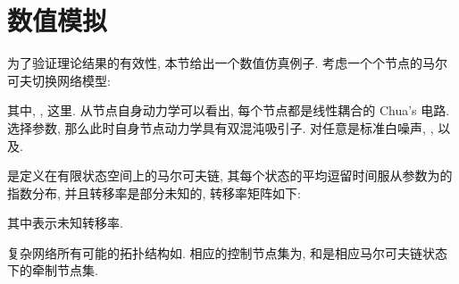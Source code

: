 \section{数值模拟}\label{simulate}
    为了验证理论结果的有效性, 本节给出一个数值仿真例子. 考虑一个个节点的马尔可夫切换网络模型:
\begin{comment}
        \begin{split}\label{exmsystem}
            \dot{x}_{i}(t)=f(x_{i}(t))-\rho(t)\sum^5_{j=1}l_{ij}(r_t)\Gamma[x_{j}(t)-x_{i}(t)+(\varepsilon_{ij}(t)\otimes\mathbf{1}_n)\xi_{ij}(t)],\quad i=1,2,\cdots,5,
        \end{split}
        \end{comment}
    其中, ,
    这里. 从节点自身动力学可以看出, 每个节点都是线性耦合的 Chua's 电路. 选择参数, 那么此时自身节点动力学具有双混沌吸引子. 对任意是标准白噪声, , 以及.
    \begin{comment}
     \begin{center}
            \subcomment[]{\texttt{[image: delay/tuopu1.eps]}}
            \subcomment[]{\texttt{[image: delay/tuopu2.eps]}}
            \subcomment[]{\texttt{[image: delay/tuopu3.eps]}}
     \end{center}
  \caption{网络系统在不同马氏链状态下可能的拓扑结构图.}\label{tuopu}
  \end{comment}
\begin{comment}[!htb]
\begin{minipage}[t]{0.48\linewidth}\centering
\texttt{[image: noise/cestate.eps]}\caption{在集中式激发策略  下, 节点各个状态随时间演变图.}\label{cefig}
\end{minipage}~~
\begin{minipage}[t]{0.48\linewidth}\centering
\texttt{[image: noise/ceEt.eps]}\caption{在集中式激发策略  下, 系统总误差随时间演变图.}\label{ceEt}
\end{minipage}
\end{comment}
   是定义在有限状态空间上的马尔可夫链, 其每个状态的平均逗留时间服从参数为的指数分布, 并且转移率是部分未知的, 转移率矩阵如下:

    其中表示未知转移率.

    复杂网络所有可能的拓扑结构如. 相应的控制节点集为, 和是相应马尔可夫链状态下的牵制节点集.
\begin{comment}[!htb]
\begin{minipage}[t]{0.48\linewidth}\centering
\texttt{[image: noise/destate.eps]}\caption{在分散式激发策略  下, 节点各个状态随时间演变图.}\label{defig}
\end{minipage}~~
\begin{minipage}[t]{0.48\linewidth}\centering
\texttt{[image: noise/deEt.eps]}\caption{在分散式激发策略  下, 系统总误差随时间演变图.}\label{deEt}
\end{minipage}
\end{comment}

